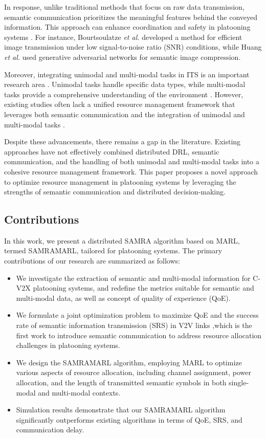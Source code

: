 \documentclass[10pt, lettersize,journal]{IEEEtran}
\begin{document}
	In response, unlike traditional methods that focus on raw data transmission, semantic communication prioritizes the meaningful features behind the conveyed information. This approach can enhance coordination and safety in platooning systems \cite{9679803}. For instance, Bourtsoulatze \emph{et al.} \cite{RN9} developed a method for efficient image transmission under low signal-to-noise ratio (SNR) conditions, while Huang \emph{et al.} \cite{RN10} used generative adversarial networks for semantic image compression.
	
	Moreover, integrating unimodal and multi-modal tasks in ITS is an important research area \cite{9642836}. Unimodal tasks handle specific data types, while multi-modal tasks provide a comprehensive understanding of the environment \cite{8884460}. However, existing studies often lack a unified resource management framework that leverages both semantic communication and the integration of unimodal and multi-modal tasks \cite{10431795}.
	
	Despite these advancements, there remains a gap in the literature. Existing approaches have not effectively combined distributed DRL, semantic communication, and the handling of both unimodal and multi-modal tasks into a cohesive resource management framework. This paper proposes a novel approach to optimize resource management in platooning systems by leveraging the strengths of semantic communication and distributed decision-making.
	
	\subsection{Contributions} 
	In this work, we present a distributed SAMRA algorithm based on MARL, termed SAMRAMARL, tailored for platooning systems. The primary contributions of our research are summarized as follows: 
	\begin{itemize} 
		\item[1)] We investigate the extraction of semantic and multi-modal information for C-V2X platooning systems, and redefine the metrics suitable for semantic and multi-modal data, as well as concept of quality of experience (QoE). 
		\item[2)] We formulate a joint optimization problem to maximize QoE and the success rate of semantic information transmission (SRS) in V2V links ,which is the first work to introduce semantic communication to address resource allocation challenges in platooning systems. 
		\item[3)] We design the SAMRAMARL algorithm, employing MARL to optimize various aspects of resource allocation, including channel assignment, power allocation, and the length of transmitted semantic symbols in both single-modal and multi-modal contexts. 
		\item[4)] Simulation results demonstrate that our SAMRAMARL algorithm significantly outperforms existing algorithms in terms of QoE, SRS, and communication delay. 
	\end{itemize}
	
\end{document}
